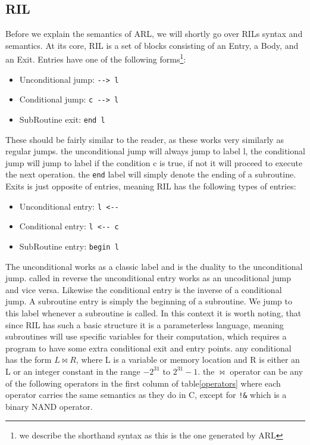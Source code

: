 \documentclass[a4paper]{article}
\begin{document}
\subsection{RIL}
\label{ril}
Before we explain the semantics of ARL, we will shortly go over RILs syntax and semantics\cite{Mogensen2018ReversibleGC}. At its core, RIL is a set of blocks consisting of an Entry, a Body, and an Exit. Entries have one of the following forms\footnote{we describe the shorthand syntax as this is the one generated by ARL}:
\begin{itemize}
\item Unconditional jump: \texttt{-{}-> l}
\item Conditional jump: \texttt{c -{}-> l}
\item SubRoutine exit: \texttt{end l}
\end{itemize}
These should be fairly similar to the reader, as these works very similarly as regular jumps. the unconditional jump will always jump to label l, the conditional jump will jump to label if the condition c is true, if not it will proceed to execute the next operation. the \texttt{end} label will simply denote the ending of a subroutine. Exits is just opposite of entries, meaning RIL has the following types of entries:
\begin{itemize}
\item Unconditional entry: \texttt{l <-{}-}
\item Conditional entry: \texttt{l <-{}- c}
\item SubRoutine entry: \texttt{begin l}
\end{itemize}
The unconditional works as a classic label and is the duality to the unconditional jump. called in reverse the unconditional entry works as an uncoditional jump and vice versa. Likewise the conditional entry is the inverse of a conditional jump. A subroutine entry is simply the beginning of a subroutine. We jump to this label whenever a subroutine is called.
In this context it is worth noting, that since RIL has such a basic structure it is a parameterless language, meaning subroutines will use specific variables for their computation, which requires a program to have some extra conditional exit and entry points. any conditional has the form \(L \bowtie R\), where L is a variable or memory location and R is either an L or an integer constant in the range \(-2^{31}\) to \(2^{31}-1\). the \(\bowtie\) operator can be any of the following operators in the first column of table\ref{operators} where each operator carries the same semantics as they do in C, except for \texttt{!\&} which is a binary NAND operator.
\end{document}
